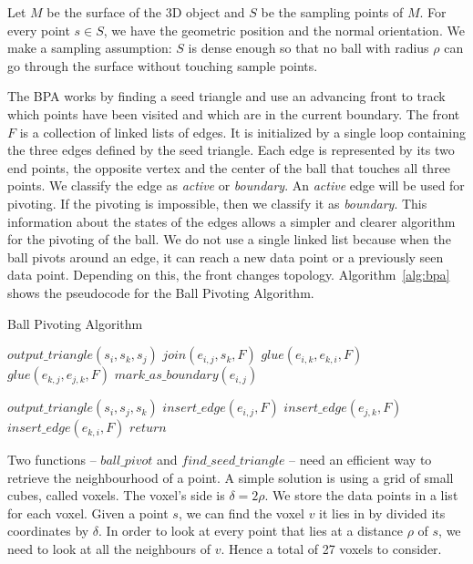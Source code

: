 \documentclass[12pt]{article}
\begin{document}
Let $M$ be the surface of the 3D object and $S$ be the sampling points of $M$. For every point $s \in S$, we have the geometric position and the normal orientation. We make a sampling assumption: $S$ is dense enough so that no ball with radius $\rho$ can go through the surface without touching sample points.

The BPA works by finding a seed triangle and use an advancing front to track which points have been visited and which are in the current boundary. The front $F$ is a collection of linked lists of edges. It is initialized by a single loop containing the three edges defined by the seed triangle. Each edge is represented by its two end points, the opposite vertex and the center of the ball that touches all three points. We classify the edge as \textit{active} or \textit{boundary}. An \textit{active} edge will be used for pivoting. If the pivoting is impossible, then we classify it as \textit{boundary}. This information about the states of the edges allows a simpler and clearer algorithm for the pivoting of the ball. We do not use a single linked list because when the ball pivots around an edge, it can reach a new data point or a previously seen data point. Depending on this, the front changes topology. Algorithm~\ref{alg:bpa} shows the pseudocode for the Ball Pivoting Algorithm.

\begin{algorithm}
\caption{Ball Pivoting Algorithm}
\label{alg:bpa}
\begin{algorithmic}[5]
      \State $output\_triangle(s_i, s_k, s_j)$
      \State $join(e_{i,j}, s_k, F)$
        \State $glue(e_{i,k}, e_{k,i}, F)$
      \EndIf
        \State $glue(e_{k,j}, e_{j,k}, F)$
      \EndIf
    \Else
      \State $mark\_as\_boundary(e_{i,j})$
    \EndIf
  \EndWhile

    \State $output\_triangle(s_i, s_j, s_k)$
    \State $insert\_edge(e_{i,j}, F)$
    \State $insert\_edge(e_{j,k}, F)$
    \State $insert\_edge(e_{k,i}, F)$
  \Else
    \State $return$
  \EndIf
\EndWhile
\end{algorithmic}
\end{algorithm} 

Two functions -- $ball\_pivot$ and $find\_seed\_triangle$ -- need an efficient way to retrieve the neighbourhood of a point. A simple solution is using a grid of small cubes, called voxels. The voxel's side is $\delta = 2\rho$. We store the data points in a list for each voxel. Given a point $s$, we can find the voxel $v$ it lies in by divided its coordinates by $\delta$. In order to look at every point that lies at a distance $\rho$ of $s$, we need to look at all the neighbours of $v$. Hence a total of 27 voxels to consider.
\end{document}
